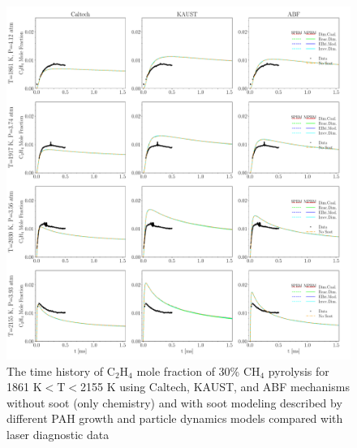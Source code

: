\begin{figure}[H]
	\centering
	\includegraphics[width=1\textwidth]{Figures/Results/Shocktube/Stanford/june/30CH4_C2H4_mechs_s0.pdf}
	\caption{The time history of $\mathrm{C_2H_4}$ mole fraction of 30\% $\mathrm{CH_4}$ pyrolysis for 1861 K$<\mathrm{T}<$2155 K using Caltech, KAUST, and ABF mechanisms without soot (only chemistry) and with soot modeling described by different PAH growth and particle dynamics models compared with laser diagnostic data}
	\label{fig:shocktubest_30ch4_c2h4_0} 
\end{figure}


